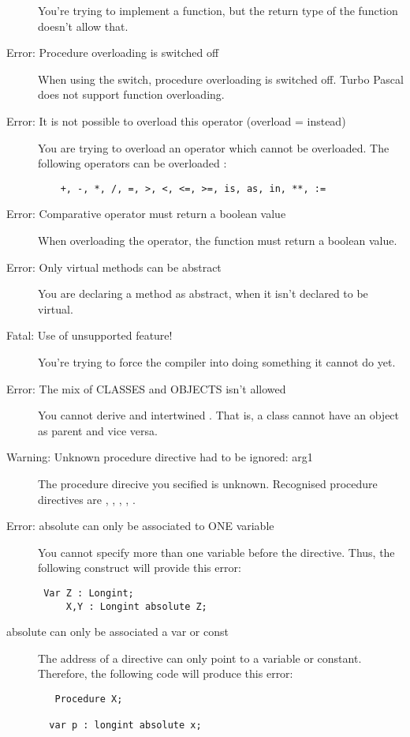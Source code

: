 \begin{description}
 You're trying to implement a  function, but the return type
 of the function doesn't allow that.
\item [Error: Procedure overloading is switched off]
 When using the  switch, procedure overloading is switched off.
 Turbo Pascal does not support function overloading.
\item [Error: It is not possible to overload this operator (overload = instead)]
 You are trying to overload an operator which cannot be overloaded.
 The following operators can be overloaded : 
 \begin{verbatim}
    +, -, *, /, =, >, <, <=, >=, is, as, in, **, :=
 \end{verbatim}
\item [Error: Comparative operator must return a boolean value]
 When overloading the \var{=} operator, the function must return a boolean
 value.
\item [Error: Only virtual methods can be abstract]
 You are declaring a method as abstract, when it isn't declared to be
 virtual.
\item [Fatal: Use of unsupported feature!]
 You're trying to force the compiler into doing something it cannot do yet.
\item [Error: The mix of CLASSES and OBJECTS isn't allowed]
 You cannot derive  and  intertwined . That is,
 a class cannot have an object as parent and vice versa.
\item [Warning: Unknown procedure directive had to be ignored: arg1]
 The procedure direcive you secified is unknown. Recognised procedure
 directives are , , , 
 , .
\item [Error: absolute can only be associated to ONE variable]
 You cannot specify more than one variable before the  directive.
 Thus, the following construct will provide this error:
 \begin{verbatim}
 Var Z : Longint;
     X,Y : Longint absolute Z;
 \end{verbatim}
 \item [ absolute can only be associated a var or const ]
 The address of a  directive can only point to a variable or
 constant. Therefore, the following code will produce this error:
 \begin{verbatim}
   Procedure X;
 
  var p : longint absolute x;
 \end{verbatim}
 

\end{description}
